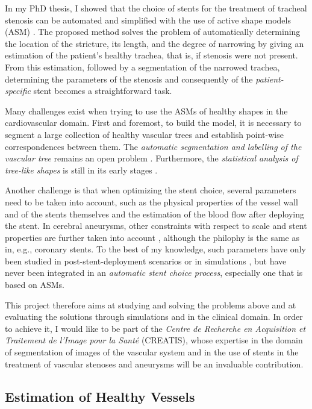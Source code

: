 In my PhD thesis, I showed that the choice of stents for the treatment of tracheal stenosis can be automated and simplified with the use of active shape models (ASM) \citep{Cootes}. The proposed method solves the problem of automatically determining the location of the stricture, its length, and the degree of narrowing by giving an estimation of the patient's healthy trachea, that is, if stenosis were not present. From this estimation, followed by a segmentation of the narrowed trachea, determining the parameters of the stenosis and consequently of the {\em patient-specific} stent becomes a straightforward task. 

Many challenges exist when trying to use the ASMs of healthy shapes in the cardiovascular domain. First and foremost, to build the model, it is necessary to segment a large collection of healthy vascular trees and establish point-wise correspondences between them. The {\em automatic segmentation and labelling of the vascular tree} remains an open problem \citep{ORKI-08,Antiga,CARR-07,Scherl200721,Bemmel,Dikkers}. Furthermore, the {\em statistical analysis of tree-like shapes} is still in its early stages \citep{Feragen}. 

Another challenge is that when optimizing the stent choice, several parameters need to be taken into account, such as the physical properties of the vessel wall and of the stents themselves and the estimation of the blood flow after deploying the stent. In cerebral aneurysms, other constraints with respect to scale and stent properties are further taken into account \citep{larrabide:2439,Larrabide2010,bogunovic:210,zhang:1294}, although the philophy is the same as in, e.g., coronary stents. To the best of my knowledge, such parameters have only been studied in post-stent-deployment scenarios or in simulations \citep{deBeule,Florez2,Gori,Vuk,FLOR-07b,Sforza}, but have never been integrated in an {\em automatic stent choice process}, especially one that is based on ASMs. 

This project therefore aims at studying and solving the problems above and at evaluating the solutions through simulations and in the clinical domain. In order to achieve it, I would like to be part of the {\em Centre de Recherche en Acquisition et Traitement de l'Image pour la Sant\'e} (CREATIS), whose expertise in the domain of segmentation of images of the vascular system and in the use of stents in the treatment of vascular stenoses and aneurysms will be an invaluable contribution.

\subsection{Estimation of Healthy Vessels}

